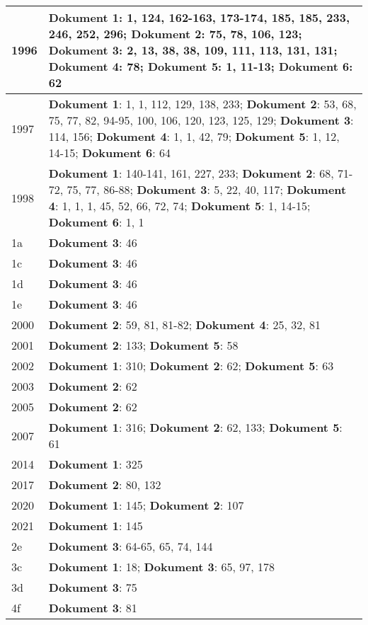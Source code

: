 \documentclass[a5paper]{article}
\begin{document}
\begin{longtable}[l]{|l|p{3in}|}
\hline
1996 & \textbf{Dokument 1}: 1, 124, 162-163, 173-174, 185, 185, 233, 246, 252, 296; \textbf{Dokument 2}: 75, 78, 106, 123; \textbf{Dokument 3}: 2, 13, 38, 38, 109, 111, 113, 131, 131; \textbf{Dokument 4}: 78; \textbf{Dokument 5}: 1, 11-13; \textbf{Dokument 6}: 62 \\
\hline
1997 & \textbf{Dokument 1}: 1, 1, 112, 129, 138, 233; \textbf{Dokument 2}: 53, 68, 75, 77, 82, 94-95, 100, 106, 120, 123, 125, 129; \textbf{Dokument 3}: 114, 156; \textbf{Dokument 4}: 1, 1, 42, 79; \textbf{Dokument 5}: 1, 12, 14-15; \textbf{Dokument 6}: 64 \\
\hline
1998 & \textbf{Dokument 1}: 140-141, 161, 227, 233; \textbf{Dokument 2}: 68, 71-72, 75, 77, 86-88; \textbf{Dokument 3}: 5, 22, 40, 117; \textbf{Dokument 4}: 1, 1, 1, 45, 52, 66, 72, 74; \textbf{Dokument 5}: 1, 14-15; \textbf{Dokument 6}: 1, 1 \\
\hline
1a & \textbf{Dokument 3}: 46 \\
\hline
1c & \textbf{Dokument 3}: 46 \\
\hline
1d & \textbf{Dokument 3}: 46 \\
\hline
1e & \textbf{Dokument 3}: 46 \\
\hline
2000 & \textbf{Dokument 2}: 59, 81, 81-82; \textbf{Dokument 4}: 25, 32, 81 \\
\hline
2001 & \textbf{Dokument 2}: 133; \textbf{Dokument 5}: 58 \\
\hline
2002 & \textbf{Dokument 1}: 310; \textbf{Dokument 2}: 62; \textbf{Dokument 5}: 63 \\
\hline
2003 & \textbf{Dokument 2}: 62 \\
\hline
2005 & \textbf{Dokument 2}: 62 \\
\hline
2007 & \textbf{Dokument 1}: 316; \textbf{Dokument 2}: 62, 133; \textbf{Dokument 5}: 61 \\
\hline
2014 & \textbf{Dokument 1}: 325 \\
\hline
2017 & \textbf{Dokument 2}: 80, 132 \\
\hline
2020 & \textbf{Dokument 1}: 145; \textbf{Dokument 2}: 107 \\
\hline
2021 & \textbf{Dokument 1}: 145 \\
\hline
2e & \textbf{Dokument 3}: 64-65, 65, 74, 144 \\
\hline
3c & \textbf{Dokument 1}: 18; \textbf{Dokument 3}: 65, 97, 178 \\
\hline
3d & \textbf{Dokument 3}: 75 \\
\hline
4f & \textbf{Dokument 3}: 81 \\

\end{longtable}
\end{document}
